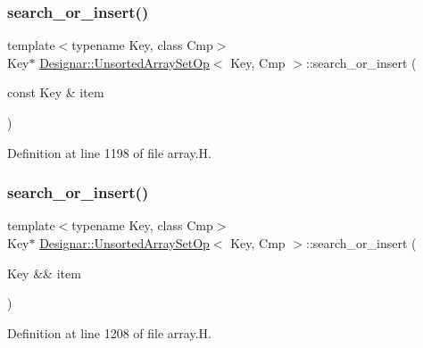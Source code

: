 \subsubsection{\texorpdfstring{search\+\_\+or\+\_\+insert()}{search\_or\_insert()}\hspace{0.1cm}{\footnotesize\ttfamily [1/2]}}
{\footnotesize\ttfamily template$<$typename Key, class Cmp$>$ \\
Key$\ast$ \hyperlink{class_designar_1_1_unsorted_array_set_op}{Designar\+::\+Unsorted\+Array\+Set\+Op}$<$ Key, Cmp $>$\+::search\+\_\+or\+\_\+insert (\begin{DoxyParamCaption}\item[{const Key \&}]{item }\end{DoxyParamCaption})\hspace{0.3cm}{\ttfamily [inline]}}



Definition at line 1198 of file array.\+H.

\mbox{\label{class_designar_1_1_unsorted_array_set_op_afbef93edb33f4767a16f27affaefcee3}} 
\subsubsection{\texorpdfstring{search\+\_\+or\+\_\+insert()}{search\_or\_insert()}\hspace{0.1cm}{\footnotesize\ttfamily [2/2]}}
{\footnotesize\ttfamily template$<$typename Key, class Cmp$>$ \\
Key$\ast$ \hyperlink{class_designar_1_1_unsorted_array_set_op}{Designar\+::\+Unsorted\+Array\+Set\+Op}$<$ Key, Cmp $>$\+::search\+\_\+or\+\_\+insert (\begin{DoxyParamCaption}\item[{Key \&\&}]{item }\end{DoxyParamCaption})\hspace{0.3cm}{\ttfamily [inline]}}



Definition at line 1208 of file array.\+H.

\mbox{\label{class_designar_1_1_unsorted_array_set_op_aa73bc195688fed065a7cdd6b3f06a02e}} 
